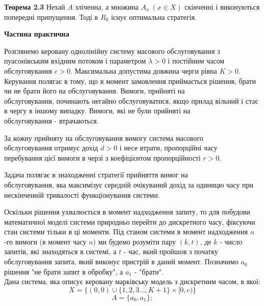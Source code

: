 \documentclass[a4paper, 14pt]{extarticle}
\begin{document}
  \textbf{Теорема 2.3}
  Нехай $A$ зліченна, а множина $A_x \ (x \in X)$ скінченні і виконуються попередні припущення. Тоді в $R_0$ існує оптимальна стратегія.
 
 
 
 
 
 
 
 
 
 
 
 
 
  \newpage
 \begin{center}
	\begin{Large}\textbf{Частина практична}\end{Large}
\end{center}
 
 
Розглянемо керовану однолінійну систему масового обслуговування з пуасонівським вхідним потоком і параметром $\lambda>0$ і постійним часом обслуговування $c>0$. Максимальна допустима довжина черги рівна $K>0$. Керування полягає в тому, що в момент замовлення приймається рішення, брати чи не брати його на обслуговування. Вимоги, прийняті на \\обслуговування, починають негайно  обслуговуватися, якщо прилад вільний і стає в чергу в іншому випадку. Вимоги, які не були прийняті на\\ обслуговування - втрачаються.\par 
За кожну прийняту на обслуговування вимогу система масового \\ обслуговування отримує дохід $d>0$ і несе втрати, пропорційні часу\\ перебування цієї вимоги в черзі з коефіцієнтом пропорційності $r>0$.\par Задача полягає в знаходженні стратегії прийняття вимог на \\ обслуговування, яка максимізує середній очікуваний дохід за одиницю часу при нескінченній тривалості функціонування системи.\par Оскільки рішення ухвалюється в момент надходження запиту, то для побудови математичної моделі системи природньо перейти до дискретного часу, фіксуючи стан системи тільки в ці моменти. Під станом системи в момент надходження $n$ -го вимоги (в момент часу $n$) ми будемо розуміти пару $(k,t)$, де $k$ - число запитів, які знаходяться в системі, а $t$ - час, який пройшов з початку обслуговування запита, який виконує пристрій в даний момент. Позначимо $a_0$ рішення "не брати запит в обробку", а $a_1$ - "брати".\\
Дана система, яка описує керовану марківську модель з дискретним часом, в якої:
$$ X = \lbrace (0,0) \cup \lbrace 1,2,3 \ldots,K+1 \rbrace \times [0,c) \rbrace$$
$$ A = \lbrace a_0, a_1 \rbrace ;$$
\end{document}
